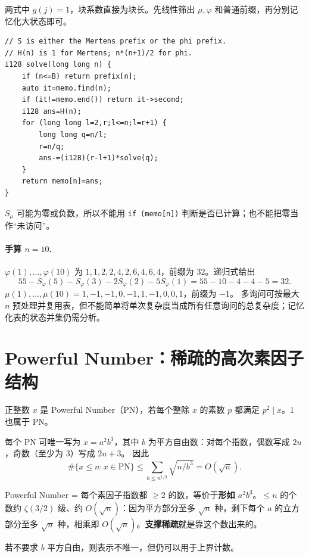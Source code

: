 \sol 两式中 $g(j)=1$，块系数直接为块长。先线性筛出 $\mu,\varphi$ 和普通前缀，再分别记忆化大状态即可。
\begin{lstlisting}
// S is either the Mertens prefix or the phi prefix.
// H(n) is 1 for Mertens; n*(n+1)/2 for phi.
i128 solve(long long n) {
    if (n<=B) return prefix[n];
    auto it=memo.find(n);
    if (it!=memo.end()) return it->second;
    i128 ans=H(n);
    for (long long l=2,r;l<=n;l=r+1) {
        long long q=n/l;
        r=n/q;
        ans-=(i128)(r-l+1)*solve(q);
    }
    return memo[n]=ans;
}
\end{lstlisting}
$S_\mu$ 可能为零或负数，所以不能用 \texttt{if (memo[n])} 判断是否已计算；也不能把零当作“未访问”。

\paragraph{手算 $n=10$.}
$\varphi(1),\ldots,\varphi(10)$ 为 $1,1,2,2,4,2,6,4,6,4$，前缀为 $32$。递归式给出
\[
55-S_\varphi(5)-S_\varphi(3)-2S_\varphi(2)-5S_\varphi(1)
=55-10-4-4-5=32.
\]
$\mu(1),\ldots,\mu(10)=1,-1,-1,0,-1,1,-1,0,0,1$，前缀为 $-1$。
\cost 多询问可按最大 $n$ 预处理并复用表，但不能简单将单次复杂度当成所有任意询问的总复杂度；记忆化表的状态并集仍需分析。


\section{Powerful Number：稀疏的高次素因子结构}
\begin{definition}
正整数 $x$ 是 Powerful Number（PN），若每个整除 $x$ 的素数 $p$ 都满足 $p^2\mid x$。$1$ 也属于 PN。
\end{definition}
每个 PN 可唯一写为 $x=a^2b^3$，其中 $b$ 为平方自由数：对每个指数，偶数写成 $2u$，奇数（至少为 $3$）写成 $2u+3$。
因此
\[
 \#\{x\le n:x\in\mathrm{PN}\}
 \le\sum_{b\le n^{1/3}}\sqrt{n/b^3}
 =O(\sqrt n).
\]

\begin{tip}
Powerful Number = 每个素因子指数都 $\ge2$ 的数，等价于\textbf{形如 $a^2b^3$}。$\le n$ 的个数约 $\zeta(3/2)$ 级、约 $O(\sqrt n)$：因为平方部分至多 $\sqrt n$ 种，剩下每个 $a$ 的立方部分至多 $\sqrt n$ 种，相乘即 $O(\sqrt n)$。\textbf{支撑稀疏}就是靠这个数出来的。
\end{tip}

若不要求 $b$ 平方自由，则表示不唯一，但仍可以用于上界计数。



